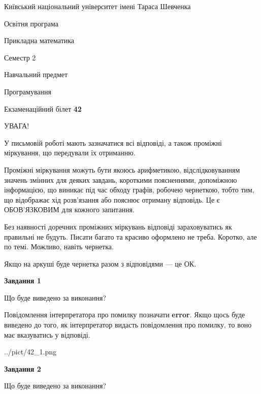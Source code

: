 \documentclass[12pt, ukrainian]{article}
\begin{document}
{{\begin {small}\par
{ \center  Київський національний університет імені Тараса Шевченка \par}
{\parbox {5 cm}{Освітня програма \hfill}{\parbox {7 cm}{Прикладна математика \hfill}}\parbox {6 cm}{\hfill Семестр 2}}\par
{\parbox {5 cm} {Навчальний предмет \hfill}\parbox {7 cm}{Програмування \hfill}\parbox {6cm}{\hfill}\par}\vspace{-7pt} \end{small}}{\center Екзаменаційний білет \No \textbf
{ 42 }\par}}
{
\begin {large}
УВАГА!

У письмовій роботі мають зазначатися всі відповіді, а також проміжні міркування, що передували їх отриманню.

Проміжні міркування можуть бути якоюсь арифметикою, відслідковуванням зна\-чень змінних для деяких завдань,
короткими поясненнями, допоміжною інформацією, що виникає під час обходу графів, робочею чернеткою,
тобто тим, що відображає хід розв’язання або пояснює отриману відповідь.
Це є ОБОВ’ЯЗКОВИМ для кожного запитання.

Без наявності доречних проміжних міркувань відповіді зараховуватись як правиль\-ні не будуть.
Писати багато та красиво оформлено не треба. Коротко, але по темі. Можли\-во, навіть чернетка.

Якщо на аркуші буде чернетка разом з відповідями --- це ОК.

\newpage

{\begin {center}\textbf{Завдання 1}\end {center}}\par
Що буде виведено за виконання?

Повідомлення інтерпретатора про помилку позначати \textbf{error}.
Якщо щось буде виведено до того, як інтерпретатор видасть повідомлення про помилку, 
то воно має вказуватись у відповіді. \par


\begin{center}
	{../pict/42_1.png}
\end{center}
\newpage

{\begin {center}\textbf{Завдання 2}\end {center}}\par
Що буде виведено за виконання?


\end{large}}
\end{document}
